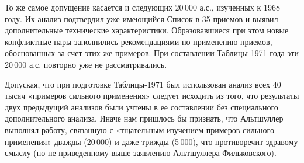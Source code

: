 \documentclass[11pt,a4paper]{article}
\begin{document}
То же самое допущение касается и следующих 20\,000 а.с., изученных к 1968
году. Их анализ подтвердил уже имеющийся Список в 35 приемов и выявил
дополнительные технические характеристики. Образовавшиеся при этом новые
конфликтные пары заполнились рекомендациями по применению приемов,
обоснованных за счет этих же примеров. При составлении Таблицы 1971 года эти
20\,000 а.с. повторно уже не рассматривались.

Допуская, что при подготовке Таблицы-1971 был использован анализ всех 40 тысяч
«примеров сильного применения» следует исходить из того, что результаты двух
предыдущий анализов были учтены в ее составлении без специального
дополнительного анализа. Иначе нам пришлось бы признать, что Альтшуллер
выполнял работу, связанную с «тщательным изучением примеров сильного
применения» дважды (20\,000) и даже трижды (5\,000), что противоречит здравому
смыслу (но не приведенному выше заявлению Альтшуллера-Фильковского).
\end{document}
